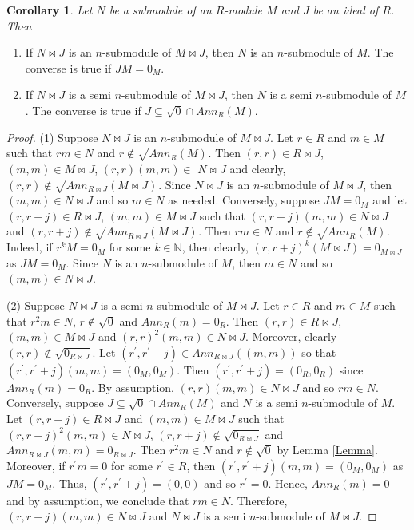 \documentclass{amsart}%
\providecommand{\U}[1]{\protect\rule{.1in}{.1in}}
\theoremstyle{plain}
\newtheorem{corollary}{Corollary}
\numberwithin{equation}{section}
\begin{document}
\begin{corollary}
\label{Dup1}Let $N$ be a submodule of an $R$-module $M$ and $J$ be an ideal of
$R$. Then
\end{corollary}

\begin{enumerate}
\item If $N\Join J$ is an $n$-submodule of $M\Join J$, then $N$ is an
$n$-submodule of $M$. The converse is true if $JM=0_{M}$.

\item If $N\Join J$ is a semi $n$-submodule of $M\Join J$, then $N$ is a semi
$n$-submodule of $M$. The converse is true if $J\subseteq\sqrt{0}\cap
Ann_{R}(M)$.
\end{enumerate}

\begin{proof}
(1) Suppose $N\Join J$ is an $n$-submodule of $M\Join J$. Let $r\in R$ and
$m\in M$ such that $rm\in N$ and $r\notin\sqrt{Ann_{R}(M)}$. Then $(r,r)\in
R\Join J$, $(m,m)\in M\Join J$, $(r,r)(m,m)\in$ $N\Join J$ and clearly,
$(r,r)\notin\sqrt{Ann_{R\Join J}(M\Join J)}$. Since $N\Join J$ is an
$n$-submodule of $M\Join J$, then $(m,m)\in N\Join J$ and so $m\in N$ as
needed. Conversely, suppose $JM=0_{M}$ and let $(r,r+j)\in R\Join J$,
$(m,m)\in M\Join J$ such that $(r,r+j)(m,m)\in N\Join J$ and $(r,r+j)\notin
\sqrt{Ann_{R\Join J}(M\Join J)}$. Then $rm\in N$ and $r\notin\sqrt{Ann_{R}%
(M)}$. Indeed, if $r^{k}M=0_{M}$ for some $k\in%
\mathbb{N}
$, then clearly, $(r,r+j)^{k}(M\Join J)=0_{M\Join J}$ as $JM=0_{M}$. Since $N$
is an $n$-submodule of $M$, then $m\in N$ and so $(m,m)\in N\Join J$.

(2) Suppose $N\Join J$ is a semi $n$-submodule of $M\Join J$. Let $r\in R$ and
$m\in M$ such that $r^{2}m\in N$, $r\notin\sqrt{0}$ and $Ann_{R}(m)=0_{R}$.
Then $(r,r)\in R\Join J$, $(m,m)\in M\Join J$ and $(r,r)^{2}(m,m)\in N\Join
J$. Moreover, clearly $(r,r)\notin\sqrt{0_{R\Join J}}$. Let $(r^{\prime
},r^{\prime}+j)\in Ann_{R\Join J}((m,m))$ so that $(r^{\prime},r^{\prime
}+j)(m,m)=(0_{M},0_{M})$. Then $(r^{\prime},r^{\prime}+j)=(0_{R},0_{R})$ since
$Ann_{R}(m)=0_{R}$. By assumption, $(r,r)(m,m)\in N\Join J$ and so $rm\in N$.
Conversely, suppose $J\subseteq\sqrt{0}\cap Ann_{R}(M)$ and $N$ is a semi
$n$-submodule of $M$. Let $(r,r+j)\in R\Join J$ and $(m,m)\in M\Join J$ such
that $(r,r+j)^{2}(m,m)\in N\Join J$, $(r,r+j)\notin\sqrt{0_{R\Join J}}$ and
$Ann_{R\Join J}(m,m)=0_{R\Join J}$. Then $r^{2}m\in N$ and $r\notin\sqrt{0}$
by Lemma \ref{Lemma}. Moreover, if $r^{\prime}m=0$ for some $r^{\prime}\in R$,
then $(r^{\prime},r^{\prime}+j)(m,m)=(0_{M},0_{M})$ as $JM=0_{M}$. Thus,
$(r^{\prime},r^{\prime}+j)=(0,0)$ and so $r^{\prime}=0$. Hence, $Ann_{R}(m)=0$
and by assumption, we conclude that $rm\in N$. Therefore, $(r,r+j)(m,m)\in
N\Join J$ and $N\Join J$ is a semi $n$-submodule of $M\Join J$.
\end{proof}
\end{document}

